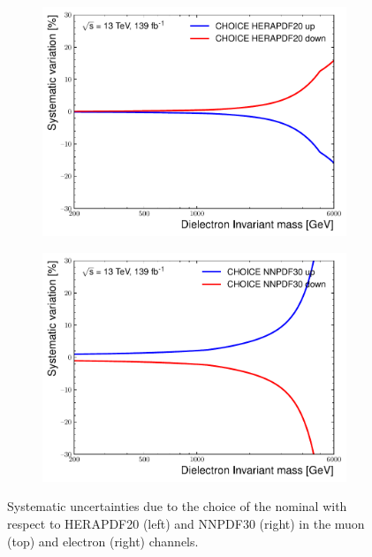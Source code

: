 \begin{figure}[h!]
    \begin{subfigure}[b]{0.42\textwidth}
        \centering
        \includegraphics[width=\textwidth]{figures/analysis/datamc/Uncertainties/theory/ee/backgroundTemplate_KF_CHOICE_HERAPDF20.pdf}
        \label{fig:uncert:eechoiceHERA}
    \end{subfigure}
    \begin{subfigure}[b]{0.42\textwidth}
        \centering
        \includegraphics[width=\textwidth]{figures/analysis/datamc/Uncertainties/theory/ee/backgroundTemplate_KF_CHOICE_NNPDF30.pdf}
        \label{fig:uncert:eechoiceNNPDF}
    \end{subfigure}
    \caption{Systematic uncertainties due to the choice of the nominal with respect to HERAPDF20 (left) and NNPDF30 (right) in the muon (top) and electron (right) channels.}
    \label{fig:uncert:pdfchoice}
\end{figure}

